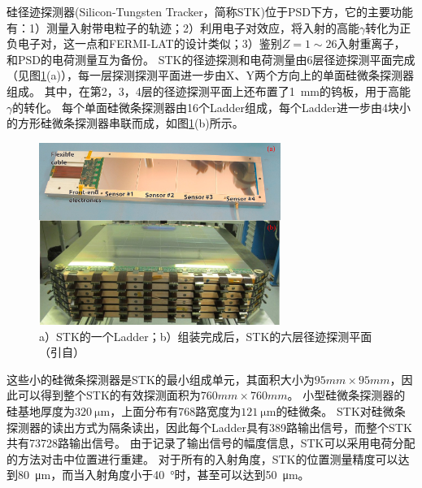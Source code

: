 硅径迹探测器(Silicon-Tungsten Tracker，简称STK)位于PSD下方\parencite{stk_dampe}，它的主要功能有：1）测量入射带电粒子的轨迹；2）利用电子对效应，将入射的高能$\gamma$转化为正负电子对，这一点和FERMI-LAT的设计类似；3）鉴别$Z=1\sim 26$入射重离子，和PSD的电荷测量互为备份。
STK的径迹探测和电荷测量由6层径迹探测平面完成（见图\ref{fig:introduction:stk_combined}(a)），每一层探测探测平面进一步由X、Y两个方向上的单面硅微条探测器组成。
其中，在第2，3，4层的径迹探测平面上还布置了\SI{1}{mm}的钨板，用于高能$\gamma$的转化。
每个单面硅微条探测器由16个Ladder组成，每个Ladder进一步由4块小的方形硅微条探测器串联而成，如图\ref{fig:introduction:stk_combined}(b)所示。
\begin{figure}[htbp]
	\centering
	\includegraphics[width=0.7\textwidth]{chap/introduction/fig/stk_combined.jpg}
	\caption{a）STK的一个Ladder；b）组装完成后，STK的六层径迹探测平面（引自\parencite{stk_dampe}）}
	\label{fig:introduction:stk_combined}
\end{figure}
这些小的硅微条探测器是STK的最小组成单元，其面积大小为$95mm\times 95mm$，因此可以得到整个STK的有效探测面积为$760mm \times 760mm$。
小型硅微条探测器的硅基地厚度为$\SI{320}{\micro\meter}$，上面分布有768路宽度为$\SI{121}{\micro\meter}$的硅微条。
STK对硅微条探测器的读出方式为隔条读出，因此每个Ladder具有389路输出信号，而整个STK共有73728路输出信号。
由于记录了输出信号的幅度信息，STK可以采用电荷分配的方法对击中位置进行重建。
对于所有的入射角度，STK的位置测量精度可以达到\SI{80}{\micro\meter}，而当入射角度小于\SI{40}{\degree}时，甚至可以达到\SI{50}{\micro\meter}。

